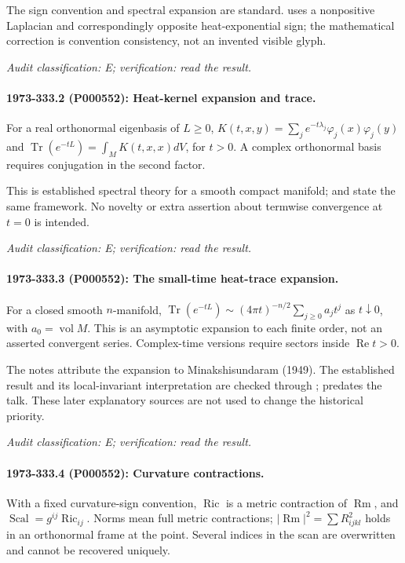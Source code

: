 The sign convention and spectral expansion are standard. \citet[\S1]{mckeansinger1967curvature} uses a nonpositive Laplacian and correspondingly opposite heat-exponential sign; the mathematical correction is convention consistency, not an invented visible glyph.

\emph{Audit classification: E; verification: read the result.}

\paragraph{1973-333.2 (P000552): Heat-kernel expansion and trace.}
For a real orthonormal eigenbasis of \(L\ge0\), \(K(t,x,y)=\sum_j e^{-t\lambda_j}\varphi_j(x)\varphi_j(y)\) and \(\operatorname{Tr}(e^{-tL})=\int_MK(t,x,x)dV\), for \(t>0\). A complex orthonormal basis requires conjugation in the second factor.

This is established spectral theory for a smooth compact manifold; \citet[\S1 and heat-kernel construction]{mckeansinger1967curvature} and \citet[introduction]{gilkey1979recursion} state the same framework. No novelty or extra assertion about termwise convergence at \(t=0\) is intended.

\emph{Audit classification: E; verification: read the result.}

\paragraph{1973-333.3 (P000552): The small-time heat-trace expansion.}
For a closed smooth \(n\)-manifold, \(\operatorname{Tr}(e^{-tL})\sim(4\pi t)^{-n/2}\sum_{j\ge0}a_jt^j\) as \(t\downarrow0\), with \(a_0=\operatorname{vol}M\). This is an asymptotic expansion to each finite order, not an asserted convergent series. Complex-time versions require sectors inside \(\operatorname{Re}t>0\).

The notes attribute the expansion to Minakshisundaram (1949). The established result and its local-invariant interpretation are checked through \citet[introduction]{gilkey1979recursion}; \citet{mckeansinger1967curvature} predates the talk. These later explanatory sources are not used to change the historical priority.

\emph{Audit classification: E; verification: read the result.}

\paragraph{1973-333.4 (P000552): Curvature contractions.}
With a fixed curvature-sign convention, \(\operatorname{Ric}\) is a metric contraction of \(\operatorname{Rm}\), and \(\operatorname{Scal}=g^{ij}\operatorname{Ric}_{ij}\). Norms mean full metric contractions; \(|\operatorname{Rm}|^2=\sum R_{ijkl}^2\) holds in an orthonormal frame at the point. Several indices in the scan are overwritten and cannot be recovered uniquely.

